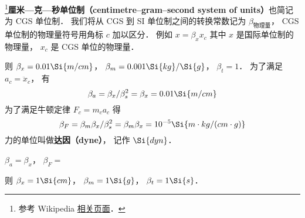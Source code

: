 
\begin{issues}
\issueDraft
{}
\end{issues}


\footnote{参考 Wikipedia \href{https://en.wikipedia.org/wiki/Centimetre-gram-second_system_of_units}{相关页面}．}\textbf{厘米—克—秒单位制（centimetre–gram–second system of units）}也简记为 CGS 单位制． 我们将从 CGS 到 SI 单位制之间的转换常数记为 $\beta_\text{物理量}$， CGS 单位制的物理量符号用角标 $c$ 加以区分． 例如 $x = \beta_x x_c$ 其中 $x$ 是国际单位制的物理量， $x_c$ 是 CGS 单位的物理量．

则 $\beta_x = 0.01\Si{m/cm}$， $\beta_m = 0.001\Si{kg}/\Si{g}$， $\beta_t = 1$． 为了满足 $a_c = \ddot x_c$， 有
\begin{equation}
\beta_a = \beta_x/\beta_s^2 = \beta_x = 0.01 \Si{m/cm}
\end{equation}
为了满足牛顿定律 $F_c = m_ca_c$ 得
\begin{equation}
\beta_F = \beta_m \beta_x/\beta_s^2 = \beta_m\beta_x = 10^{-5} \Si{m\cdot kg/(cm\cdot g)}
\end{equation}
力的单位叫做\textbf{达因（dyne）}， 记作 $\Si{dyn}$．

$\beta_a = \beta_x$， $\beta_F = $

则 $\beta_x = 1\Si{cm}$， $\beta_m = 1\Si{g}$， $\beta_t = 1\Si{s}$．



